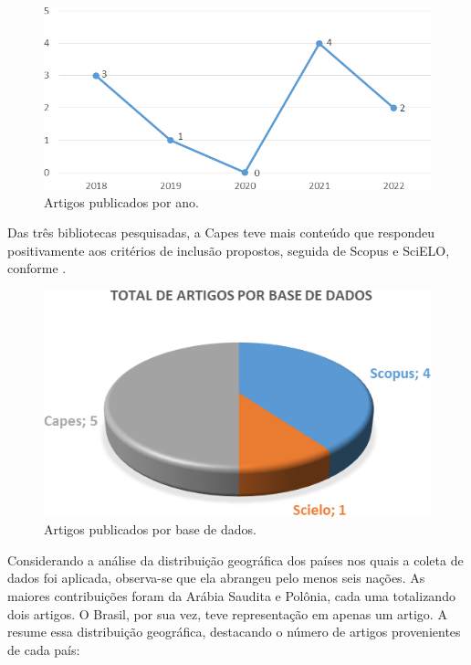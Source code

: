 \documentclass[portuguese]{textolivre}
\begin{document}
\begin{figure}[htbp]
\centering
\begin{minipage}{0.65\linewidth}
  \includegraphics[width=\linewidth]{Fig2.png}
  \caption{Artigos publicados por ano.}
  \label{fig2}
\end{minipage}
\end{figure}

Das três bibliotecas pesquisadas, a Capes teve mais conteúdo que respondeu positivamente aos critérios de inclusão propostos, seguida de Scopus e SciELO, conforme .

\begin{figure}[htbp]
\centering
\begin{minipage}{0.65\linewidth}
  \includegraphics[width=\linewidth]{Fig3.png}
  \caption{Artigos publicados por base de dados.}
  \label{fig3}
\end{minipage}
\end{figure}

Considerando a análise da distribuição geográfica dos países nos quais a coleta de dados foi aplicada, observa-se que ela abrangeu pelo menos seis nações. As maiores contribuições foram da Arábia Saudita e Polônia, cada uma totalizando dois artigos. O Brasil, por sua vez, teve representação em apenas um artigo. A  resume essa distribuição geográfica, destacando o número de artigos provenientes de cada país:
\end{document}
